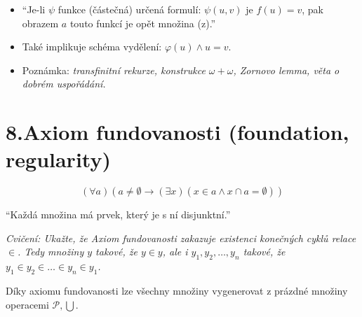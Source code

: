 \begin{itemize}
	\item “Je-li $\psi$ funkce (částečná) určená formulí: $\psi (u,v) \text{ je } f(u)=v$, pak obrazem $a$ touto funkcí je opět množina (z).”
	\item Také implikuje schéma vydělení: $\varphi (u) \land u = v$.
	\item Poznámka: \textit{transfinitní rekurze, konstrukce $\omega + \omega$, Zornovo lemma, věta o dobrém uspořádání.}
\end{itemize}

\section{8.Axiom fundovanosti (foundation, regularity)}

$$
(\forall a)(a \neq \emptyset \rightarrow (\exists x)(x \in a \land x \cap a = \emptyset))
$$

“Každá množina má prvek, který je s ní disjunktní.”

\textit{Cvičení: Ukažte, že Axiom fundovanosti zakazuje existenci konečných cyklů relace $\in$. Tedy množiny $y$ takové, že $y \in y$, ale i $y_{1},y_{2}, \dots ,y_{n}$ takové, že $y_{1} \in y_{2} \in \dots \in y_{n} \in y_{1}$.}

Díky axiomu fundovanosti lze všechny množiny vygenerovat z prázdné množiny operacemi $\mathcal{P}, \bigcup$.